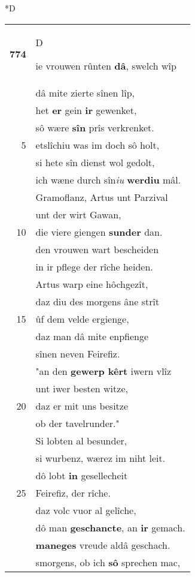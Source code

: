 \documentclass[8pt,a4paper,notitlepage]{article}
\begin{document}
\begin{table}[ht]
\begin{minipage}[t]{0.5\linewidth}
\small
\begin{center}*D
\end{center}
\begin{tabular}{rl}
\textbf{774} & \begin{large}D\end{large}ie vrouwen rûnten \textbf{dâ}, swelch wîp\\ 
 & dâ mite zierte sînen lîp,\\ 
 & het \textbf{er} gein \textbf{ir} gewenket,\\ 
 & sô wære \textbf{sîn} prîs verkrenket.\\ 
5 & etslîchiu was im doch sô holt,\\ 
 & si hete sîn dienst wol gedolt,\\ 
 & ich wæne durch sîn\textit{iu} \textbf{werdiu} mâl.\\ 
 & Gramoflanz, Artus unt Parzival\\ 
 & unt der wirt Gawan,\\ 
10 & die viere giengen \textbf{sunder} dan.\\ 
 & den vrouwen wart bescheiden\\ 
 & in ir pflege der rîche heiden.\\ 
 & Artus warp eine hôchgezît,\\ 
 & daz diu des morgens âne strît\\ 
15 & ûf dem velde ergienge,\\ 
 & daz man dâ mite enpfienge\\ 
 & sînen neven Feirefiz.\\ 
 & "an den \textbf{gewerp kêrt} iwern vlîz\\ 
 & unt iwer besten witze,\\ 
20 & daz er mit uns besitze\\ 
 & ob der tavelrunder."\\ 
 & Si lobten al besunder,\\ 
 & si wurbenz, wærez im niht leit.\\ 
 & dô lobt \textbf{in} gesellecheit\\ 
25 & Feirefiz, der rîche.\\ 
 & daz volc vuor al gelîche,\\ 
 & dô man \textbf{geschancte}, an \textbf{ir} gemach.\\ 
 & \textbf{maneges} vreude aldâ geschach.\\ 
 & smorgens, ob ich \textbf{sô} sprechen mac,\\ 

\end{tabular}
\end{minipage}
\end{table}
\end{document}
